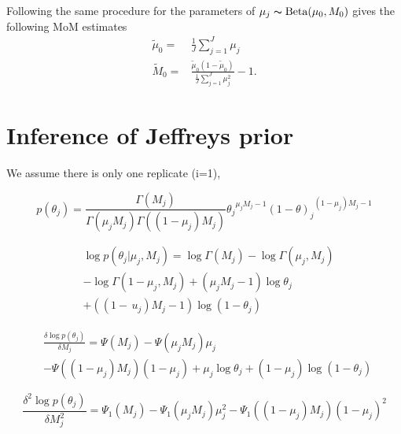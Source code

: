 \documentclass{bioinfo}
\begin{document}
Following the same procedure for the parameters of $\mu_j \thicksim \text{Beta}(\mu_0, M_0)$ gives the following MoM estimates
\begin{eqnarray}
	\tilde{\mu}_0 =& \frac{1}{J} \sum_{j=1}^J \mu_j \\
	\tilde{M}_0 =& \frac{ \tilde{\mu}_0 (1 - \tilde{\mu}_0 ) } {\frac{1}{J} \sum_{j=1}^J \mu_j^2 } -1.
\end{eqnarray}

\section{Inference of Jeffreys prior}\label{sec:appendix_Jeffreys}
We assume there is only one replicate (i=1),

\begin{equation}\label{eqn:Betapdf}
p\left({\theta }_{j} \right)= \frac{\Gamma \left({M}_{j} \right)}{\Gamma \left({\mu }_{j} {M}_{j}\right)\Gamma \left(( 1-{\mu }_{j}){M}_{j}\right)} {{\theta}_{j}}^{{\mu}_{j}{M}_{j}-1}{\left(1-\theta\right)_{j}}^{\left(1-{\mu}_{j}\right){M}_{j}-1}
\end{equation}

\begin{equation}\label{equ:JefferyInference1}
\begin{split}
&\log p\left(\theta_{j}|\mu_{j},M_{j}\right) =\log \Gamma \left(M_{j}\right)-\log \Gamma\left(\mu_{j},M_{j}\right)\\
&- \log \Gamma\left(1-\mu_{j},M_{j}\right) + (\mu_{j}M_{j}-1)\log\theta_{j}\\
& + ((1-\,u_{j})M_{j}-1)\log(1-\theta_{j})\
\end{split}
\end{equation}

\begin{equation}
\begin{split}
&\frac{\delta\log p(\theta_{j})}{\delta M_{j}} =\Psi(M_{j}) - \Psi(\mu_{j} M_{j})\mu_{j}\\
&- \Psi((1-\mu_{j})M_{j})(1-\mu_{j}) +\mu_{j}\log\theta_{j} + (1-\mu_{j})\log(1-\theta_{j})\
\end{split}
\end{equation}

\begin{equation}
\frac{\delta^{2}\log p(\theta_{j})}{\delta M_{j}^{2}}  = \Psi_{1}(M_{j}) - \Psi_{1}(\mu_{j} M_{j})\mu_{j}^{2} - \Psi_{1}((1-\mu_{j})M_{j})(1-\mu_{j})^{2}
\end{equation}
\end{document}
